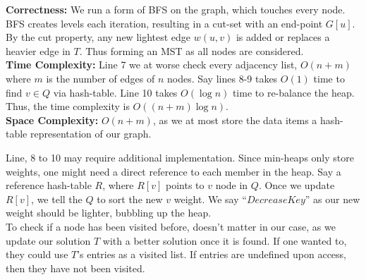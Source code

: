 \begin{Func}
    \noindent
    \textbf{Correctness:} We run a form of BFS on the graph, which touches every node. BFS creates levels each iteration, resulting in a cut-set with an end-point $G[u]$.
    By the cut property, any new lightest edge $w(u,v)$ is added or replaces a heavier edge in $T$. Thus forming an MST as all nodes are considered.\\
    \textbf{Time Complexity:} Line 7 we at worse check every adjacency list, $O(n+m)$ where $m$ is the number of edges of $n$ nodes. 
    Say lines 8-9 takes $O(1)$ time to find $v\in Q$ via hash-table. Line 10 takes $O(\log n)$ time to re-balance the heap.
    Thus, the time complexity is $O((n+m)\log n)$.\\
    \textbf{Space Complexity:} $O(n+m)$, as we at most store the data items a hash-table representation of our graph.
\end{Func}

\noindent
Line, 8 to 10 may require additional implementation. Since min-heaps only store weights, one 
might need a direct reference to each member in the heap. Say a reference hash-table $R$, where $R[v]$ 
points to $v$ node in $Q$. Once we update $R[v]$, we tell the $Q$ to sort the new $v$ weight. We say
``$DecreaseKey$'' as our new weight should be lighter, bubbling up the heap.\\

\noindent
To check if a node has been visited before, doesn't matter in our case, as we update our solution $T$ with 
a better solution once it is found. If one wanted to, they could use $T$'s entries as a visited list. If entries are
undefined upon access, then they have not been visited.\\

